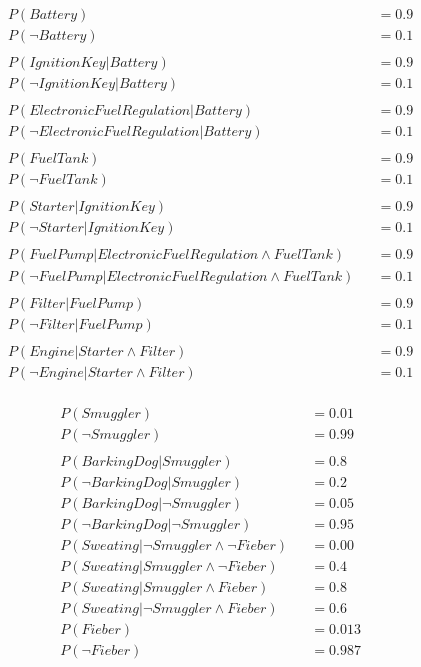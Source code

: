 \documentclass[ngerman]{fbi-aufgabenblatt}
\begin{document}
\begin{align*}
&P(Battery) &&= 0.9\\
&P(\neg Battery) &&= 0.1\\
&\\
&P(Ignition Key|Battery) &&= 0.9\\
&P(\neg Ignition Key| Battery) &&= 0.1\\
&\\
&P(Electronic Fuel Regulation|Battery) &&= 0.9\\
&P(\neg Electronic Fuel Regulation| Battery) &&= 0.1\\
&\\
&P(Fuel Tank) &&= 0.9\\
&P(\neg Fuel Tank) &&= 0.1\\
&\\
&P(Starter| Ignition Key) &&= 0.9\\
&P(\neg Starter | Ignition Key) &&= 0.1\\
&\\
&P(Fuel Pump | Electronic Fuel Regulation \land Fuel Tank) &&= 0.9\\
&P(\neg Fuel Pump | Electronic Fuel Regulation \land Fuel Tank) &&= 0.1\\
&\\
&P(Filter | Fuel Pump) &&= 0.9\\
&P(\neg Filter | Fuel Pump) &&= 0.1\\
&\\
&P(Engine | Starter \land Filter) &&= 0.9\\
&P(\neg Engine | Starter \land Filter) &&= 0.1\\
\end{align*}



\begin{align*}
&P(Smuggler) &&= 0.01\\
&P(\neg Smuggler) &&= 0.99\\
&\\
&P(BarkingDog | Smuggler) &&= 0.8\\
&P(\neg BarkingDog | Smuggler) &&= 0.2\\
&P(BarkingDog | \neg Smuggler) &&= 0.05\\
&P(\neg BarkingDog | \neg Smuggler) &&= 0.95\\
&P(Sweating | \neg Smuggler \land  \neg Fieber) &&= 0.00\\
&P(Sweating |  Smuggler \land \neg Fieber) &&= 0.4\\
&P(Sweating |  Smuggler \land Fieber) &&= 0.8\\
&P(Sweating |  \neg Smuggler \land Fieber) &&= 0.6\\
&P(Fieber) &&= 0.013\\
&P(\neg Fieber) &&= 0.987\\
\end{align*}
\end{document}
